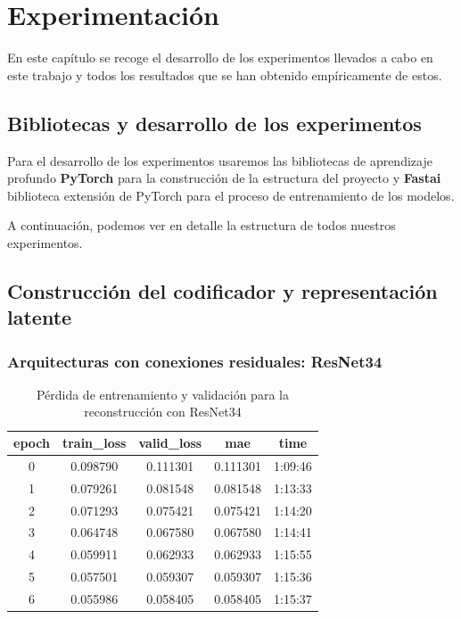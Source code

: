 \chapter{Experimentación}

En este capítulo se recoge el desarrollo de los experimentos llevados a cabo en este trabajo y todos los resultados que se han obtenido empíricamente de estos.

\section{Bibliotecas y desarrollo de los experimentos}

Para el desarrollo de los experimentos usaremos las bibliotecas de aprendizaje profundo \textbf{PyTorch} para la construcción de la estructura del proyecto y \textbf{Fastai} biblioteca extensión de PyTorch para el proceso de entrenamiento de los modelos.

A continuación, podemos ver en detalle la estructura de todos nuestros experimentos.


\section{Construcción del codificador y representación latente}


\subsection{Arquitecturas con conexiones residuales: ResNet34}

\begin{table}[H]
	\centering
	\begin{tabular}{|c|c|c|c|c|}
		\hline
		epoch & train\_loss & valid\_loss & mae & time \\ \hline
		0 & 0.098790 & 0.111301 & 0.111301 & 1:09:46 \\ \hline
		1 & 0.079261 & 0.081548 & 0.081548 & 1:13:33 \\ \hline
		2 & 0.071293 & 0.075421 & 0.075421 & 1:14:20 \\ \hline
		3 & 0.064748 & 0.067580 & 0.067580 & 1:14:41 \\ \hline
		4 & 0.059911 & 0.062933 & 0.062933 & 1:15:55 \\ \hline
		5 & 0.057501 & 0.059307 & 0.059307 & 1:15:36 \\ \hline
		6 & 0.055986 & 0.058405 & 0.058405 & 1:15:37 \\ \hline
	\end{tabular}
	\caption{Pérdida de entrenamiento y validación para la reconstrucción con ResNet34}
	\label{tabla:resultados2}
\end{table}


